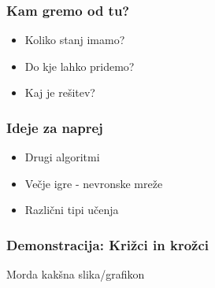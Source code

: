 \documentclass{beamer}    %
\begin{document}
\begin{frame}
    \frametitle{Kam gremo od tu?}
    \begin{itemize}
        \item Koliko stanj imamo?
        \item Do kje lahko pridemo?
        \item Kaj je rešitev?
    \end{itemize}
\end{frame}


\begin{frame}
    \frametitle{Ideje za naprej}
    \begin{itemize}
        \item Drugi algoritmi
        \item Večje igre - nevronske mreže
        \item Različni tipi učenja 
    \end{itemize}
\end{frame}


%    


\begin{frame}
    \frametitle{Demonstracija: Križci in krožci}
    Morda kakšna slika/grafikon
\end{frame}



\end{document}
